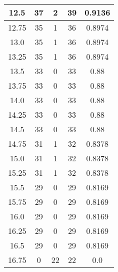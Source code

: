 \documentclass[letterpaper, 12pt]{article}
\begin{document}
\begin{longtable}{|c|c|c|c|c|}
12.5 & 37 & 2 & 39 & 0.9136 \\
\hline
12.75 & 35 & 1 & 36 & 0.8974 \\
\hline
13.0 & 35 & 1 & 36 & 0.8974 \\
\hline
13.25 & 35 & 1 & 36 & 0.8974 \\
\hline
13.5 & 33 & 0 & 33 & 0.88 \\
\hline
13.75 & 33 & 0 & 33 & 0.88 \\
\hline
14.0 & 33 & 0 & 33 & 0.88 \\
\hline
14.25 & 33 & 0 & 33 & 0.88 \\
\hline
14.5 & 33 & 0 & 33 & 0.88 \\
\hline
14.75 & 31 & 1 & 32 & 0.8378 \\
\hline
15.0 & 31 & 1 & 32 & 0.8378 \\
\hline
15.25 & 31 & 1 & 32 & 0.8378 \\
\hline
15.5 & 29 & 0 & 29 & 0.8169 \\
\hline
15.75 & 29 & 0 & 29 & 0.8169 \\
\hline
16.0 & 29 & 0 & 29 & 0.8169 \\
\hline
16.25 & 29 & 0 & 29 & 0.8169 \\
\hline
16.5 & 29 & 0 & 29 & 0.8169 \\
\hline
16.75 & 0 & 22 & 22 & 0.0 \\
\hline
\end{longtable}
\end{document}
